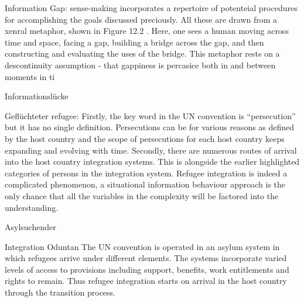\documentclass[12pt,oneside]{article}
\begin{document}
Information Gap:
\cite{dervin2003sense}
sense-making incorporates a repertoire of potenteial procedures for accomplishing the goals discussed preciously. All these are drawn from a xenral metaphor, shown in Figure 12.2 \includegraphics[width=00.5]{SMM_MEtaphor.jpg}. Here, one sees a human moving across time and space, facing a gap, building a bridge across the gap, and then constructing and evaluating the uses of the bridge. This metaphor rests on a descontinuity assumption - that gappiness is percasice both in and between moments in ti

Informationslücke

Geflüchteter
refugee:
Firstly, the key word in the UN convention is “persecution”
but it has no single definition. Persecutions can be for
various reasons as defined by the host country and the
scope of persecutions for each host country keeps
expanding and evolving with time. Secondly, there are
numerous routes of arrival into the host country integration
systems. This is alongside the earlier highlighted categories
of persons in the integration system. Refugee integration is
indeed a complicated phenomenon, a situational
information behaviour approach is the only chance that all
the variables in the complexity will be factored into the
understanding.

Asylsuchender

Integration
Oduntan
The UN convention is operated in an asylum system in
which refugees arrive under different elements. The
systems incorporate varied levels of access to provisions
including support, benefits, work entitlements and rights to
remain. Thus refugee integration starts on arrival in the host
country through the transition process.
\end{document}
